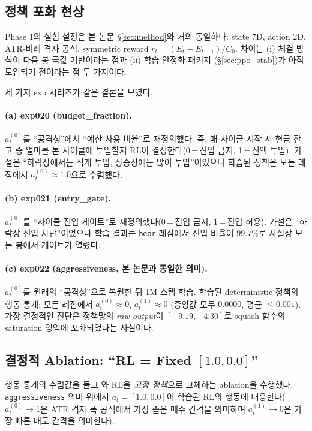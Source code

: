 \documentclass[11pt, a4paper]{article}
\begin{document}
\subsection{정책 포화 현상}
\label{sec:phase1_setting}

Phase 1의 실험 설정은 본 논문 \S\ref{sec:method}와 거의 동일하다: state 7D,
action 2D, ATR-비례 격자 공식, symmetric reward $r_t = (E_t - E_{t-1})/C_0$.
차이는 (i) 체결 방식이 다음 봉 극값 기반이라는 점과 (ii) 학습 안정화 패키지
(\S\ref{sec:ppo_stab})가 아직 도입되기 전이라는 점 두 가지이다.

세 가지 exp 시리즈가 같은 결론을 보였다.

\paragraph{(a) exp020 (budget\_fraction).}
$a_t^{(0)}$를 ``공격성''에서 ``예산 사용 비율''로 재정의했다. 즉, 매 사이클 시작 시
현금 잔고 중 얼마를 본 사이클에 투입할지 RL이 결정한다(0\,=\,진입 금지,
1\,=\,전액 투입). 가설은 ``하락장에서는 적게 투입, 상승장에는 많이 투입''이었으나
학습된 정책은 모든 레짐에서 $a_t^{(0)} \approx 1.0$으로 수렴했다.

\paragraph{(b) exp021 (entry\_gate).}
$a_t^{(0)}$를 ``사이클 진입 게이트''로 재정의했다(0\,=\,진입 금지, 1\,=\,진입 허용).
가설은 ``하락장 진입 차단''이었으나 학습 결과는 \texttt{bear} 레짐에서 진입 비율이
$99.7\%$로 사실상 모든 봉에서 게이트가 열렸다.

\paragraph{(c) exp022 (aggressiveness, 본 논문과 동일한 의미).}
$a_t^{(0)}$를 원래의 ``공격성''으로 복원한 뒤 1M 스텝 학습. 학습된 deterministic
정책의 행동 통계: 모든 레짐에서 $a_t^{(0)} \approx 0$, $a_t^{(1)} \approx 0$
(중앙값 모두 $0.0000$, 평균 $\leq 0.001$). 가장 결정적인 진단은 정책망의
\emph{raw output}이 $[-9.19, -4.30]$로 squash 함수의 saturation 영역에
포화되었다는 사실이다.

\subsection{결정적 Ablation: ``RL = Fixed $[1.0, 0.0]$''}
\label{sec:phase1_ablation}

행동 통계의 수렴값을 들고 와 RL을 \emph{고정 정책}으로 교체하는 ablation을 수행했다.
\texttt{aggressiveness} 의미 위에서 $a_t = [1.0, 0.0]$이 학습된 RL의 행동에
대응한다($a_t^{(0)} \to 1$은 ATR 격자 폭 공식에서 가장 좁은 매수 간격을 의미하며
$a_t^{(1)} \to 0$은 가장 빠른 매도 간격을 의미한다).
\end{document}
